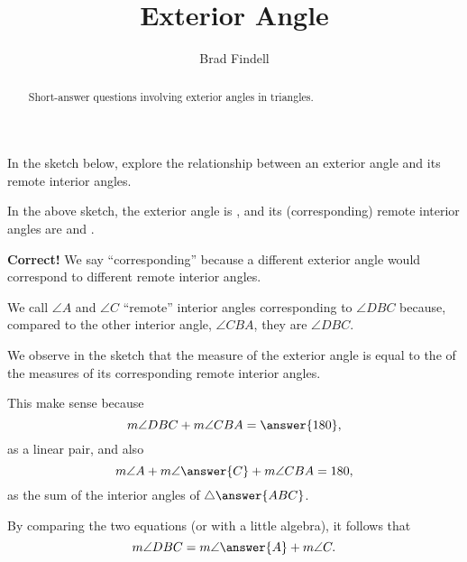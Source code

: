 \documentclass[nooutcomes]{ximera}
\title{Exterior Angle}
\author{Brad Findell}
\begin{document}
\begin{abstract}
Short-answer questions involving exterior angles in triangles. 
\end{abstract}
\maketitle


In the sketch below, explore the relationship between an exterior angle and its remote interior angles. 
\begin{center}  
\end{center}

\begin{problem}
In the above sketch, the exterior angle is 
, and its (corresponding) remote interior angles are  and . 

\begin{feedback}[correct]
\textbf{Correct!} We say ``corresponding'' because a different exterior angle would correspond to different remote interior angles.
\end{feedback}
\begin{problem}
We call $\angle A$ and $\angle C$ ``remote'' interior angles corresponding to $\angle DBC$ because, compared to the other interior angle, $\angle CBA$, they are 
 $\angle DBC$.
\end{problem}
\end{problem}

\begin{problem}
We observe in the sketch that the measure of the exterior angle is equal to the 
 of the measures of its corresponding remote interior angles.  

This make sense because 
\[
m\angle DBC + m\angle CBA = \answer{180},
\]
as a linear pair, and also 
\[
m\angle A + m\angle \answer{C} + m\angle CBA = 180, 
\]
as the sum of the interior angles of $\triangle \answer{ABC}$.  

By comparing the two equations (or with a little algebra), it follows that 
\[
m\angle DBC = m\angle \answer{A} + m\angle C.
\]
\end{problem}
\end{document}

